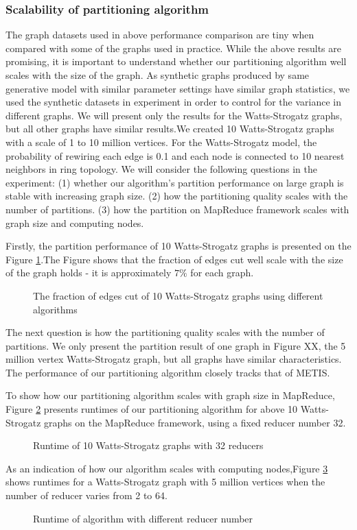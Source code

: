 \documentclass{acm_proc_article-sp}
\begin{document}
\subsubsection {Scalability of partitioning algorithm}
The graph datasets used in above performance comparison are tiny when compared with some of the graphs used in practice. While the above results are promising, it is important to understand whether our partitioning algorithm well scales with the size of the graph. As synthetic graphs produced by same generative model with similar parameter settings have similar graph statistics, we used the synthetic datasets in experiment in order to control for the variance in different graphs. We will present only the results for the Watts-Strogatz graphs, but all other graphs have similar results.We created 10 Watts-Strogatz graphs with a scale of 1 to 10 million vertices. For the Watts-Strogatz model, the probability of rewiring each edge is 0.1 and each node is connected to 10 nearest neighbors in ring topology. We will consider the following questions in the experiment: (1) whether our algorithm's partition performance on large graph is stable with increasing graph size. (2) how the partitioning quality scales with the number of partitions. (3) how the partition on MapReduce framework scales with graph size and computing nodes.
\par
Firstly, the partition performance of 10 Watts-Strogatz graphs is presented on the Figure \ref{fig:datasize}.The Figure shows that the fraction of edges cut well scale with the size of the graph holds - it is approximately $7\%$ for each graph.
\begin{figure}
\centering
{}
\caption{The fraction of edges cut of 10 Watts-Strogatz graphs using different algorithms}
\label{fig:datasize}
\end{figure}

The next question is how the partitioning quality scales with the number of partitions. We only present the partition result of one graph in Figure XX, the 5 million  vertex Watts-Strogatz graph, but all graphs have similar characteristics. The performance of our partitioning algorithm closely tracks that of METIS.


To show how our partitioning algorithm scales with graph size in MapReduce, Figure \ref{fig:runtime} presents runtimes of our partitioning algorithm for above 10 Watts-Strogatz graphs on the MapReduce framework, using a fixed reducer number 32.
\begin{figure}
\centering
{}
\caption{Runtime of 10 Watts-Strogatz graphs with 32 reducers }
\label{fig:runtime}
\end{figure}
As an indication of how our algorithm scales with computing nodes,Figure \ref{fig:reducerNum} shows runtimes for a Watts-Strogatz graph with 5 million vertices when the number of reducer varies from 2 to 64.
\begin{figure}
\centering
{}
\caption{Runtime of algorithm with different reducer number}
\label{fig:reducerNum}
\end{figure}
\end{document}
